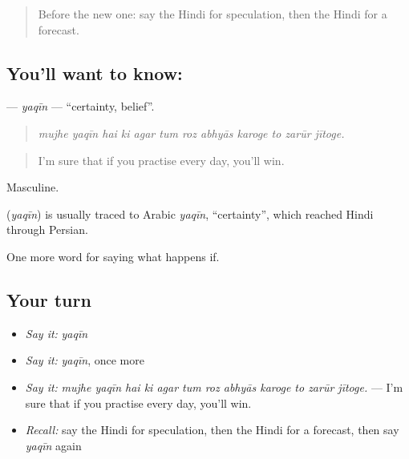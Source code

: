 \label{lesson:HI-C374-yaqin}



\begin{quote}
Before the new one: say the Hindi for speculation, then the Hindi for a forecast.
\end{quote}

\subsection*{You'll want to know: }
\textbf{} — \emph{yaqīn} — \textquotedblleft{}certainty, belief\textquotedblright{}.

\begin{quote}
           
\end{quote}

\begin{quote}
\emph{mujhe yaqīn hai ki agar tum roz abhyās karoge to zarūr jītoge.}
\end{quote}

\begin{quote}
I'm sure that if you practise every day, you'll win.
\end{quote}

Masculine.

\begin{cousinweb}
\textbf{} (\emph{yaqīn}) is usually traced to Arabic \emph{yaqīn}, \textquotedblleft{}certainty\textquotedblright{}, which reached Hindi through Persian.
\end{cousinweb}

\begin{grammarlens}[title={What you've built}]
One more word for saying what happens if.
\end{grammarlens}

\subsection*{Your turn}
\begin{itemize}
\raggedright
  \item \emph{Say it:} \emph{yaqīn}
  \item \emph{Say it:} \emph{yaqīn}, once more
  \item \emph{Say it:} \emph{mujhe yaqīn hai ki agar tum roz abhyās karoge to zarūr jītoge.} — I'm sure that if you practise every day, you'll win.
  \item \emph{Recall:} say the Hindi for speculation, then the Hindi for a forecast, then say \emph{yaqīn} again
\end{itemize}


